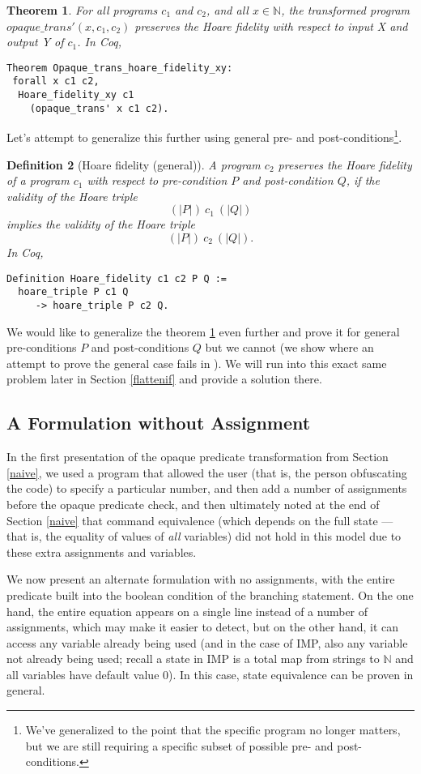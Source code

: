 \documentclass[compsoc,conference,a4paper,10pt,times]{IEEEtran}
\newtheorem{theorem}{Theorem}[section]
\newtheorem{defin}[theorem]{Definition}
\begin{document}
\begin{theorem}\label{hoare_xy_main}
For all programs $c_1$ and $c_2$, and all $x \in \mathbb{N}$, the transformed program $opaque\_trans'(x, c_1, c_2)$ preserves the Hoare fidelity with respect to input X and output Y of $c_1$.  
In Coq, \begin{verbatim}
Theorem Opaque_trans_hoare_fidelity_xy: 
 forall x c1 c2,
  Hoare_fidelity_xy c1 
    (opaque_trans' x c1 c2).
\end{verbatim}
\end{theorem}

Let's attempt to generalize this further using general pre- and post-conditions\footnote{We've generalized to the point that the specific program no longer matters, but we are still requiring a specific subset of possible pre- and post-conditions.}.

\begin{defin}[Hoare fidelity (general)]
A program $c_2$ preserves the Hoare fidelity of a program $c_1$ with respect to pre-condition $P$ and post-condition $Q$, if the validity of the Hoare triple
\[
(| P |)\ c_1\ (| Q |)
\]
implies the validity of the Hoare triple
\[
(| P |)\ c_2\ (| Q |).
\]
In Coq,
\begin{verbatim}
Definition Hoare_fidelity c1 c2 P Q :=
  hoare_triple P c1 Q 
     -> hoare_triple P c2 Q.
\end{verbatim}
\end{defin}

We would like to generalize the theorem \ref{hoare_xy_main} even further and prove it for general pre-conditions $P$ and post-conditions $Q$ but we cannot (we show where an attempt to prove the general case fails in \cite{Weyun}). We will run into this exact same problem later in Section \ref{flattenif} and provide a solution there.  

\subsection{A Formulation without Assignment}\label{noass}
In the first presentation of the opaque predicate transformation from Section \ref{naive}, we used a program that allowed
the user (that is, the person obfuscating the code) to specify a particular number, and then add a number of assignments before the
opaque predicate check, and then ultimately noted at the end of Section \ref{naive} that command equivalence (which depends on the full state --- that is, the equality of values of \emph{all} variables) did not
hold in this model due to these extra assignments and variables.
\par
We now present an alternate formulation with no assignments, with the entire predicate
built into the boolean condition of the branching statement. On the one hand, the entire
equation appears on a single line instead of a number of assignments, which may make it
easier to detect, but on the other hand, it can access any variable already being used (and
in the case of IMP, also any variable not already being used; recall a state in IMP is a total map
from strings to $\mathbb{N}$ and all variables have default value 0).  In this case, state equivalence can be proven in general.
\end{document}
